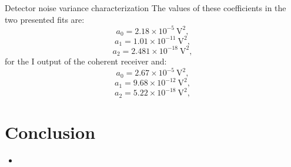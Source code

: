 \documentclass{beamer}
\begin{document}
\begin{frame}[t]{Detector noise variance characterization}
The values of these coefficients in the two presented fits are:
$$a_0=2.18\times10^{-5}~\text{V}^2,$$
$$a_1=1.01\times10^{-11}~\text{V}^2,$$
$$a_2=2.481\times10^{-18}~\text{V}^2,$$
for the I output of the coherent receiver and:
$$a_0=2.67\times10^{-5}~\text{V}^2,$$
$$a_1=9.68\times10^{-12}~\text{V}^2,$$
$$a_2=5.22\times10^{-18}~\text{V}^2,$$
\end{frame}




\section{Conclusion}
\begin{frame}[t]
\begin{itemize}
\item
\end{itemize}
\end{frame}
\end{document}
